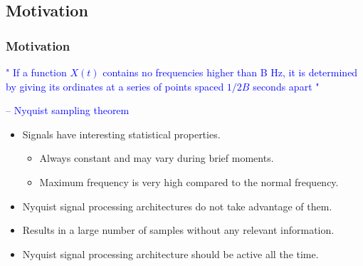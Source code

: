 \documentclass{beamer}
\begin{document}
\subsection*{Motivation}
\begin{frame}
	\frametitle{Motivation} \footnotesize
	\textcolor{blue} {" If a function $X(t)$ contains no frequencies higher than B Hz, it is determined by giving its 
				ordinates at a series of points spaced $1/2B$ seconds apart "}
	\begin{flushright}
	\textcolor{blue} {-- Nyquist sampling theorem} \\
	\end{flushright}
	\begin{itemize}
		\item{Signals have interesting statistical properties.}
			\begin{itemize} \scriptsize
				\item{Always constant and may vary during brief moments.}
				\item{Maximum frequency is very high compared to the normal frequency.}
			\end{itemize}
		\item{Nyquist signal processing architectures do not take advantage of them.}\\
		\item{Results in a large number of samples without any relevant information.}\\
		\item{Nyquist signal processing architecture should be active all the time.}\\			
        \end{itemize}
\end{frame}
\end{document}
